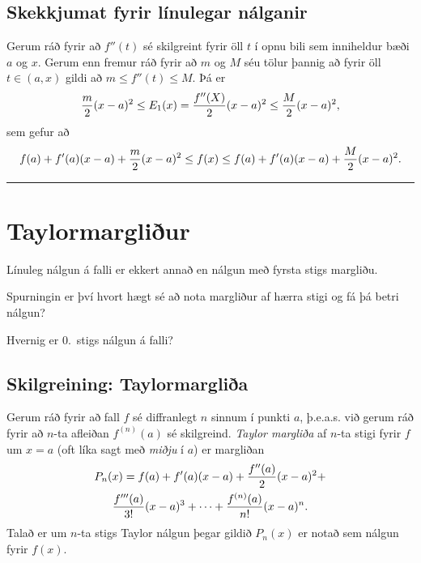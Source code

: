 \documentclass[a4paper,10pt,icelandic]{sphinxmanual}
\begin{document}
\subsection{Skekkjumat fyrir línulegar nálganir}
\label{kafli03:skekkjumat-fyrir-linulegar-nalganir}
Gerum ráð fyrir að \(f''(t)\) sé skilgreint fyrir öll \(t\) í
opnu bili sem inniheldur bæði \(a\) og \(x\). Gerum enn fremur
ráð fyrir að \(m\) og \(M\) séu tölur þannig að fyrir öll
\(t\in (a, x)\) gildi að \(m\leq f''(t)\leq M\). Þá er
\begin{gather}
\begin{split}\frac{m}{2}(x-a)^2\leq E_1(x)
=\frac{f''(X)}{2}(x-a)^2\leq \frac{M}{2}(x-a)^2,\end{split}\notag
\end{gather}
sem gefur að
\begin{gather}
\begin{split}f(a)+f'(a)(x-a)+\frac{m}{2}(x-a)^2\leq f(x)
\leq f(a)+f'(a)(x-a)+\frac{M}{2}(x-a)^2.\end{split}\notag
\end{gather}

\bigskip\hrule{}\bigskip



\section{Taylormargliður}
\label{kafli03:taylormargliur}
Línuleg nálgun á falli er ekkert annað en nálgun með fyrsta stigs
margliðu.

Spurningin er því hvort hægt sé að nota margliður af hærra stigi og fá
þá betri nálgun?

Hvernig er 0. stigs nálgun á falli?


\subsection{Skilgreining: Taylormargliða}
\label{kafli03:index-13}\label{kafli03:skilgreining-taylormarglia}
Gerum ráð fyrir að fall \(f\) sé diffranlegt \(n\) sinnum í
punkti \(a\), þ.e.a.s. við gerum ráð fyrir að \(n\)-ta afleiðan
\(f^{(n)}(a)\) sé skilgreind. \emph{Taylor margliða} af \(n\)-ta
stigi fyrir \(f\) um \(x=a\) (oft líka sagt með \emph{miðju} í
\(a\)) er margliðan
\begin{gather}
\begin{split}\begin{gathered}
    P_n(x)=f(a)+f'(a)(x-a)+\frac{f''(a)}{2}(x-a)^2+ \\
    \frac{f'''(a)}{3!}(x-a)^3+\cdots+\frac{f^{(n)}(a)}{n!}(x-a)^n.\end{gathered}\end{split}\notag
\end{gather}
Talað er um \(n\)-ta stigs Taylor nálgun þegar gildið \(P_n(x)\)
er notað sem nálgun fyrir \(f(x)\).
\end{document}
